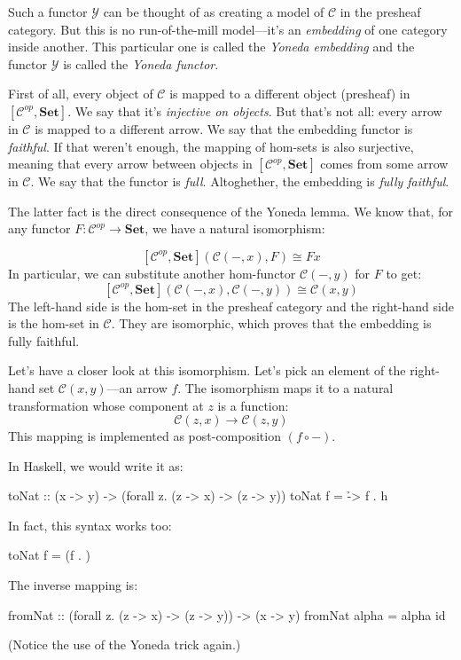 \documentclass[DaoFP]{subfiles}
\begin{document}
Such a functor $\mathcal{Y}$ can be thought of as creating a model of $\mathcal{C}$ in the presheaf category. But this is no run-of-the-mill model---it's an \emph{embedding} of one category inside another. This particular one is called the \emph{Yoneda embedding} and the functor $\mathcal{Y}$ is called the \emph{Yoneda functor}. 

First of all, every object of $\mathcal{C}$ is mapped to a different object (presheaf) in $[\mathcal{C}^{op},  \mathbf{Set}]$. We say that it's \emph{injective on objects}. But that's not all: every arrow in $\mathcal{C}$ is mapped to a different arrow. We say that the embedding functor is \emph{faithful}. If that weren't enough, the mapping of hom-sets is also surjective, meaning that every arrow between objects in $[\mathcal{C}^{op},  \mathbf{Set}]$ comes from some arrow in $\mathcal{C}$. We say that the functor is \emph{full}. Altoghether, the embedding is \emph{fully faithful}.

The latter fact is the direct consequence of the Yoneda lemma. We know that, for any functor $F \colon \mathcal{C}^{op} \to \mathbf{Set}$, we have a natural isomorphism:

\[ [\mathcal{C}^{op}, \mathbf{Set}]( \mathcal{C}(-, x), F) \cong F x \]
In particular, we can substitute another hom-functor $\mathcal{C}(-, y)$ for $F$ to get:
\[ [\mathcal{C}^{op}, \mathbf{Set}]( \mathcal{C}(-, x), \mathcal{C}(-, y)) \cong \mathcal{C}(x, y)\]
The left-hand side is the hom-set in the presheaf category and the right-hand side is the hom-set in $\mathcal{C}$. They are isomorphic, which proves that the embedding is fully faithful.

Let's have a closer look at this isomorphism. Let's pick an element of the right-hand set $\mathcal{C}(x, y)$---an arrow $f$. The isomorphism maps it to a natural transformation whose component at $z$ is a function:
\[ \mathcal{C}(z, x) \to \mathcal{C}(z, y) \]
This mapping is implemented as post-composition $(f \circ -)$.

In Haskell, we would write it as:
\begin{haskell}
toNat :: (x -> y) -> (forall z. (z -> x) -> (z -> y))
toNat f = \h -> f . h 
\end{haskell}
In fact, this syntax works too:
\begin{haskell}
toNat f = (f . )
\end{haskell}
The inverse mapping is:
\begin{haskell}
fromNat :: (forall z. (z -> x) -> (z -> y)) -> (x -> y)
fromNat alpha = alpha id
\end{haskell}
(Notice the use of the Yoneda trick again.)
\end{document}
